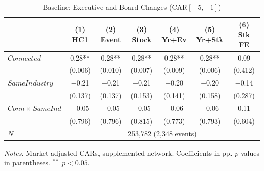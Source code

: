 \begin{table}[htbp]
\centering
\begin{threeparttable}
\caption{Baseline: Executive and Board Changes (CAR$[-5,-1]$)}
\label{tab:baseline}
\footnotesize
\begin{tabular}{lcccccc}
\toprule
 & (1) HC1 & (2) Event & (3) Stock & (4) Yr+Ev & (5) Yr+Stk & (6) Stk FE \\
\midrule
$Connected$ & 0.28** & 0.28** & 0.28** & 0.28** & 0.28** & 0.09 \\
 & (0.006) & (0.010) & (0.007) & (0.009) & (0.006) & (0.412) \\[0.2em]
$SameIndustry$ & $-$0.21 & $-$0.21 & $-$0.21 & $-$0.20 & $-$0.20 & $-$0.14 \\
 & (0.137) & (0.137) & (0.153) & (0.141) & (0.158) & (0.287) \\[0.2em]
$Conn \times SameInd$ & $-$0.05 & $-$0.05 & $-$0.05 & $-$0.06 & $-$0.06 & 0.11 \\
 & (0.796) & (0.796) & (0.815) & (0.773) & (0.793) & (0.604) \\
\midrule
$N$ & \multicolumn{6}{c}{253,782 (2,348 events)} \\
\bottomrule
\end{tabular}
\begin{tablenotes}
\scriptsize
\item \textit{Notes.} Market-adjusted CARs, supplemented network. Coefficients in pp. $p$-values in parentheses. $^{**}$ $p<0.05$.
\end{tablenotes}
\end{threeparttable}
\end{table}